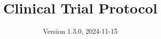 \documentclass[
]{scrartcl}
\title{Clinical Trial Protocol}
\subtitle{ADVANCE TRAUMA\\
\strut \\
Effects of Advanced Trauma Life Support\textsuperscript{®} Training
Compared to Standard Care on Adult Trauma Patient Outcomes: A Cluster
Randomised Trial}
\author{Version 1.3.0, 2024-11-15}
\date{}
\begin{document}


\begin{titlepage}


\newcommand{\titlepagepagealign}{
\ifthenelse{\equal{center}{right}}{\raggedleft}{}
\ifthenelse{\equal{center}{center}}{\centering}{}
\ifthenelse{\equal{center}{left}}{\raggedright}{}
}


\newcommand{\titleandsubtitle}{
{\fontsize{15}{18.0}\selectfont
{\uppercase{\nohyphens{Clinical Trial Protocol}}}\par
}%

\vspace{\betweentitlesubtitle}
{
\fontsize{20}{24.0}\selectfont
{\bfseries{\nohyphens{ADVANCE TRAUMA\\
\strut \\
Effects of Advanced Trauma Life Support\textsuperscript{®} Training
Compared to Standard Care on Adult Trauma Patient Outcomes: A Cluster
Randomised Trial}}}\par
}}
\newcommand{\titlepagetitleblock}{
\rule{\textwidth}{0.4pt} %
\vspace{0.025\textheight} %

\titleandsubtitle

\vspace{0.025\textheight} 
\rule{0.3\textwidth}{0.4pt} %
}
\newcommand{\authorstyle}[1]{{\Large{#1}}}

\newcommand{\affiliationstyle}[1]{{\large{#1}}}

\newcommand{\titlepageauthorblock}{
{\authorstyle{\nohyphens{Version 1.3.0, 2024-11-15}\\}}
}

\newcommand{\titlepageaffiliationblock}{
\hangindent=1em
\hangafter=1
{\affiliationstyle{


\vspace{1\baselineskip} 
}}
}
\newcommand{\headerstyled}{%
{}
}
\newcommand{\footerstyled}{%
{\large{\textsc{}}}
}
\newcommand{\datestyled}{%
{}
}


\newcommand{\titlepageheaderblock}{\headerstyled}

\newcommand{\titlepagefooterblock}{
\footerstyled
}

\newcommand{\titlepagedateblock}{
\datestyled
}

\newcommand{\titleblock}{\newlength{\betweentitlesubtitle}
\setlength{\betweentitlesubtitle}{\baselineskip}
{

}}
\end{titlepage}
\end{document}
